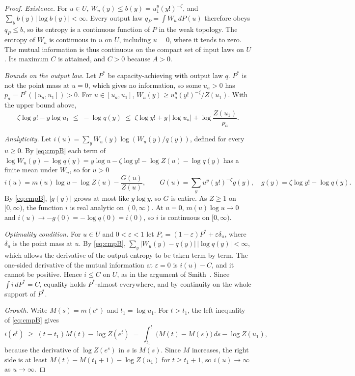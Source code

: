 \begin{proof}
\emph{Existence.} For $u\in U$, $W_u(y)\le b(y)=u_1^y(y!)^{-\zeta}$, and $\sum_y b(y)\lvert\log b(y)\rvert<\infty$. Every output law
$q_P=\int W_u\,dP(u)$ therefore obeys $q_P\le b$, so its entropy is a continuous function of $P$ in the weak topology. The entropy of
$W_u$ is continuous in $u$ on $U$, including $u=0$, where it tends to zero. The mutual information is thus continuous on the compact
set of input laws on $U$. Its maximum $C$ is attained, and $C>0$ because $A>0$.

\emph{Bounds on the output law.} Let $P^*$ be capacity-achieving with output law $q$. $P^*$ is not the point mass at $u=0$, which
gives no information, so some $u_a>0$ has $p_a=P^*([u_a,u_1])>0$. For $u\in[u_a,u_1]$, $W_u(y)\ge u_a^y(y!)^{-\zeta}/Z(u_1)$. With
the upper bound above,
\begin{equation}\label{eq:cmpB}
\zeta\log y!-y\log u_1\;\le\;-\log q(y)\;\le\;\zeta\log y!+y\,\lvert\log u_a\rvert+\log\frac{Z(u_1)}{p_a}.
\end{equation}

\emph{Analyticity.} Let $i(u)=\sum_y W_u(y)\log(W_u(y)/q(y))$, defined for every $u\ge0$. By \eqref{eq:cmpB} each term of
$\log W_u(y)-\log q(y)=y\log u-\zeta\log y!-\log Z(u)-\log q(y)$ has a finite mean under $W_u$, so for $u>0$
\[
i(u)=m(u)\log u-\log Z(u)-\frac{G(u)}{Z(u)},\qquad G(u)=\sum_y u^y(y!)^{-\zeta}g(y),\quad g(y)=\zeta\log y!+\log q(y).
\]
By \eqref{eq:cmpB}, $\lvert g(y)\rvert$ grows at most like $y\log y$, so $G$ is entire. As $Z\ge1$ on $[0,\infty)$, the function $i$ is
real analytic on $(0,\infty)$. At $u=0$, $m(u)\log u\to0$ and $i(u)\to-g(0)=-\log q(0)=i(0)$, so $i$ is continuous on $[0,\infty)$.

\emph{Optimality condition.} For $u\in U$ and $0<\varepsilon<1$ let $P_\varepsilon=(1-\varepsilon)P^*+\varepsilon\delta_u$, where $\delta_u$ is the point mass at $u$. By
\eqref{eq:cmpB}, $\sum_y\lvert W_u(y)-q(y)\rvert\,\lvert\log q(y)\rvert<\infty$, which allows the derivative of the output entropy
to be taken term by term. The one-sided derivative of the mutual information at $\varepsilon=0$ is $i(u)-C$, and it cannot be
positive. Hence $i\le C$ on $U$, as in the argument of Smith~\cite{Smith1971}. Since $\int i\,dP^*=C$, equality holds
$P^*$-almost everywhere, and by continuity on the whole support of $P^*$.

\emph{Growth.} Write $M(s)=m(e^s)$ and $t_1=\log u_1$. For $t>t_1$, the left inequality of \eqref{eq:cmpB} gives
\[
i(e^t)\;\ge\;(t-t_1)M(t)-\log Z(e^t)\;=\;\int_{t_1}^{t}\bigl(M(t)-M(s)\bigr)\,ds-\log Z(u_1),
\]
because the derivative of $\log Z(e^s)$ in $s$ is $M(s)$. Since $M$ increases, the right side is at least
$M(t)-M(t_1+1)-\log Z(u_1)$ for $t\ge t_1+1$, so $i(u)\to\infty$ as $u\to\infty$.


\end{proof}
